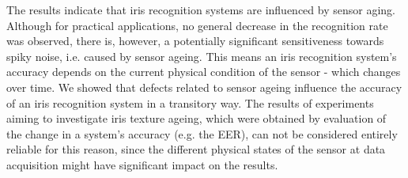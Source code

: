 \documentclass[10pt,twocolumn,letterpaper]{article}
\begin{document}
The results indicate that iris recognition systems are influenced by sensor aging. Although for practical applications, no general decrease in the recognition rate was observed, there is, however, a potentially significant sensitiveness towards spiky noise, i.e. caused by sensor ageing. This means an iris recognition system's accuracy depends on the current physical condition of the sensor - which changes over time. We showed that defects related to sensor ageing influence the accuracy of an iris recognition system in a transitory way. The results of experiments aiming to investigate iris texture ageing, which were obtained by evaluation of the change in a system's accuracy (e.g. the EER), can not be considered entirely reliable for this reason, since the different physical states of the sensor at data acquisition might have significant impact on the results.  
 
 




{\small


}

\end{document}
